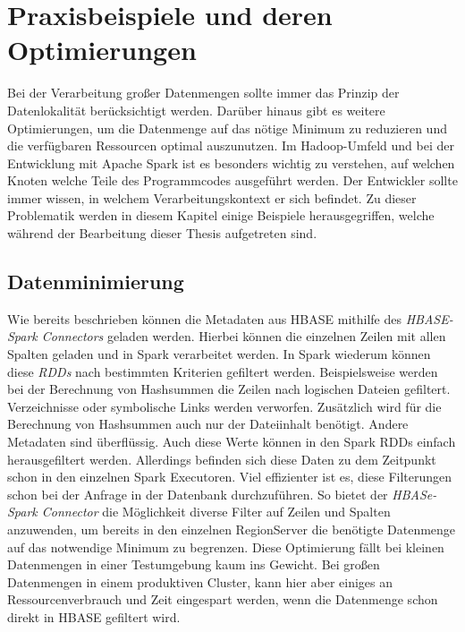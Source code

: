 \section{Praxisbeispiele und deren Optimierungen}
Bei der Verarbeitung großer Datenmengen sollte immer das Prinzip der Datenlokalität berücksichtigt werden. Darüber hinaus gibt es weitere Optimierungen, um die Datenmenge auf das nötige Minimum zu reduzieren und die verfügbaren Ressourcen optimal auszunutzen. Im Hadoop-Umfeld und bei der Entwicklung mit Apache Spark ist es besonders wichtig zu verstehen, auf welchen Knoten welche Teile des Programmcodes ausgeführt werden. Der Entwickler sollte immer wissen, in welchem Verarbeitungskontext er sich befindet. Zu dieser Problematik werden in diesem Kapitel einige Beispiele herausgegriffen, welche während der Bearbeitung dieser Thesis aufgetreten sind.\\

\subsection*{Datenminimierung}
Wie bereits beschrieben können die Metadaten aus HBASE mithilfe des \textit{HBASE-Spark Connectors} geladen werden. Hierbei können die einzelnen Zeilen mit allen Spalten geladen und in Spark verarbeitet werden. In Spark wiederum können diese \textit{RDDs} nach bestimmten Kriterien gefiltert werden. Beispielsweise werden bei der Berechnung von Hashsummen die Zeilen nach logischen Dateien gefiltert. Verzeichnisse oder symbolische Links werden verworfen. Zusätzlich wird für die Berechnung von Hashsummen auch nur der Dateiinhalt benötigt. Andere Metadaten sind überflüssig. Auch diese Werte können in den Spark RDDs einfach herausgefiltert werden. Allerdings befinden sich diese Daten zu dem Zeitpunkt schon in den einzelnen Spark Executoren. Viel effizienter ist es, diese Filterungen schon bei der Anfrage in der Datenbank durchzuführen. So bietet der \textit{HBASe-Spark Connector} die Möglichkeit diverse Filter auf Zeilen und Spalten anzuwenden, um bereits in den einzelnen RegionServer die benötigte Datenmenge auf das notwendige Minimum zu begrenzen. Diese Optimierung fällt bei kleinen Datenmengen in einer Testumgebung kaum ins Gewicht. Bei großen Datenmengen in einem produktiven Cluster, kann hier aber einiges an Ressourcenverbrauch und Zeit eingespart werden, wenn die Datenmenge schon direkt in HBASE gefiltert wird.\\

